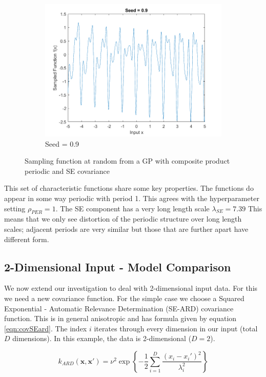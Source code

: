 \documentclass[]{article}
\begin{document}
\begin{figure}[!h]
\begin{subfigure}{0.3\linewidth}
		\includegraphics[width=\linewidth]{1d3}
		\caption{Seed = 0.9}
		\label{fig:1d3}
	\end{subfigure}
	\caption{Sampling function at random from a GP with composite product periodic and SE covariance}
	\label{fig:1d}
\end{figure}

This set of characteristic functions share some key properties. The functions do appear in some way periodic with period 1. This agrees with the hyperparameter setting $\rho_{PER}=1$. The SE component has a very long length scale $\lambda_{SE}=7.39$ This means that we only see distortion of the periodic structure over long length scales; adjacent periods are very similar but those that are further apart have different form.

\subsection{2-Dimensional Input - Model Comparison}

We now extend our investigation to deal with 2-dimensional input data. For this we need a new covariance function. For the simple case we choose a Squared Exponential - Automatic Relevance Determination (SE-ARD) covariance function. This is in general anisotropic and has formula given by equation \ref{eqn:covSEard}. The index $i$ iterates through every dimension in our input (total $D$ dimensions). In this example, the data is 2-dimensional ($D=2$).

\begin{equation}
k_{ARD}(\mathbf{x}, \mathbf{x}') = \nu^2 \exp\left\{- \frac{1}{2} \sum_{i=1}^{D}\frac{(x_i-x_i')^2}{\lambda_i^2}\right\}
\label{eqn:covSEard}
\end{equation}
\end{document}
